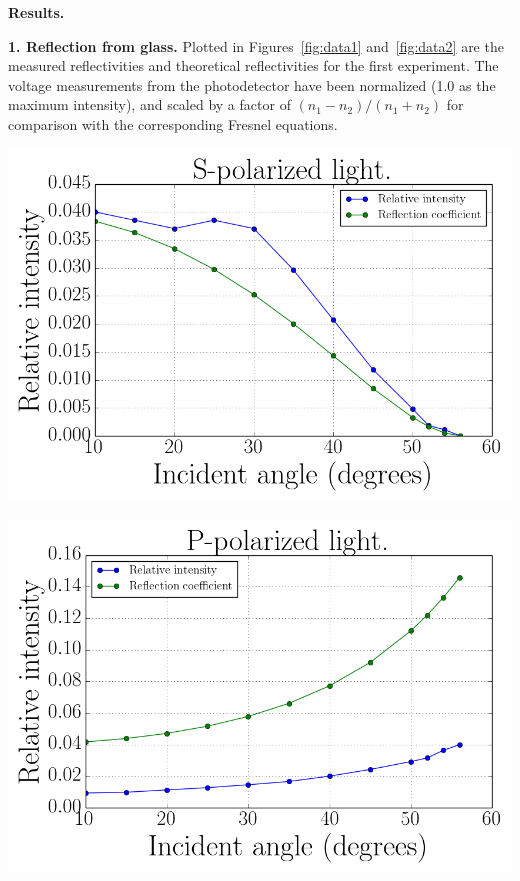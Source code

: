 \documentclass{article}
\newenvironment{2colfig}{
  \par\medskip\noindent\minipage{\linewidth}
} {
  \endminipage\par\medskip
}
\newcommand{\labhead}[1]{
  \vspace{1em}
  {\bf #1}$_{\,}$
  \hline
  \vspace{1em}
}
\begin{document}
\begin{multicols*}{2}
\labhead{Results.}
{\bf 1. Reflection from glass.} Plotted in Figures~\ref{fig:data1} and~\ref{fig:data2} are the measured reflectivities and theoretical
reflectivities for the first experiment. The voltage measurements from the photodetector have been normalized (1.0 as
the maximum intensity), and scaled by a factor of $(n_1 - n_2)/(n_1 + n_2)$ for comparison with the corresponding
Fresnel equations.
\begin{2colfig}
  \center
  \includegraphics[scale=.4]{data1}
  \label{fig:data1}
\end{2colfig}

\begin{2colfig}
  \center
  \includegraphics[scale=.4]{data2}
  \label{fig:data2}
\end{2colfig}


\end{multicols*}
\end{document}
